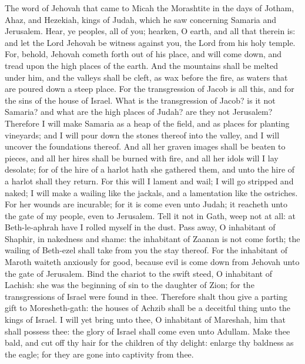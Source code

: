 


The word of Jehovah that came to Micah the Morashtite in the days of Jotham, Ahaz, and Hezekiah, kings of Judah, which he saw concerning Samaria and Jerusalem.  Hear, ye peoples, all of you; hearken, O earth, and all that therein is: and let the Lord Jehovah be witness against you, the Lord from his holy temple. For, behold, Jehovah cometh forth out of his place, and will come down, and tread upon the high places of the earth. And the mountains shall be melted under him, and the valleys shall be cleft, as wax before the fire, as waters that are poured down a steep place. For the transgression of Jacob is all this, and for the sins of the house of Israel. What is the transgression of Jacob? is it not Samaria? and what are the high places of Judah? are they not Jerusalem? Therefore I will make Samaria as a heap of the field, and as places for planting vineyards; and I will pour down the stones thereof into the valley, and I will uncover the foundations thereof. And all her graven images shall be beaten to pieces, and all her hires shall be burned with fire, and all her idols will I lay desolate; for of the hire of a harlot hath she gathered them, and unto the hire of a harlot shall they return.  For this will I lament and wail; I will go stripped and naked; I will make a wailing like the jackals, and a lamentation like the ostriches. For her wounds are incurable; for it is come even unto Judah; it reacheth unto the gate of my people, even to Jerusalem. Tell it not in Gath, weep not at all: at Beth-le-aphrah have I rolled myself in the dust. Pass away, O inhabitant of Shaphir, in nakedness and shame: the inhabitant of Zaanan is not come forth; the wailing of Beth-ezel shall take from you the stay thereof. For the inhabitant of Maroth waiteth anxiously for good, because evil is come down from Jehovah unto the gate of Jerusalem. Bind the chariot to the swift steed, O inhabitant of Lachish: she was the beginning of sin to the daughter of Zion; for the transgressions of Israel were found in thee. Therefore shalt thou give a parting gift to Moresheth-gath: the houses of Achzib shall be a deceitful thing unto the kings of Israel. I will yet bring unto thee, O inhabitant of Mareshah, him that shall possess thee: the glory of Israel shall come even unto Adullam. Make thee bald, and cut off thy hair for the children of thy delight: enlarge thy baldness as the eagle; for they are gone into captivity from thee. 

